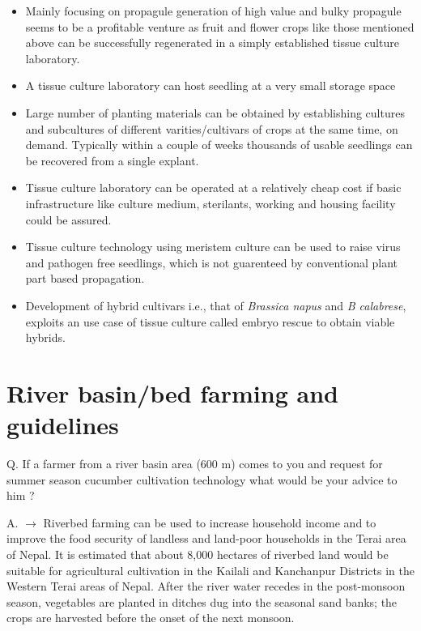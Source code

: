 \documentclass[
  openany]{book}
\providecommand{\tightlist}{%
  \setlength{\itemsep}{0pt}\setlength{\parskip}{0pt}}
\begin{document}
\begin{itemize}
\tightlist
\item
  Mainly focusing on propagule generation of high value and bulky propagule seems to be a profitable venture as fruit and flower crops like those mentioned above can be successfully regenerated in a simply established tissue culture laboratory.
\item
  A tissue culture laboratory can host seedling at a very small storage space
\item
  Large number of planting materials can be obtained by establishing cultures and subcultures of different varities/cultivars of crops at the same time, on demand. Typically within a couple of weeks thousands of usable seedlings can be recovered from a single explant.
\item
  Tissue culture laboratory can be operated at a relatively cheap cost if basic infrastructure like culture medium, sterilants, working and housing facility could be assured.
\item
  Tissue culture technology using meristem culture can be used to raise virus and pathogen free seedlings, which is not guarenteed by conventional plant part based propagation.
\item
  Development of hybrid cultivars i.e., that of \emph{Brassica napus} and \emph{B calabrese}, exploits an use case of tissue culture called embryo rescue to obtain viable hybrids.
\end{itemize}

\hypertarget{river-basinbed-farming-and-guidelines}{%
\section{River basin/bed farming and guidelines}\label{river-basinbed-farming-and-guidelines}}

Q. If a farmer from a river basin area (600 m) comes to you and request for summer season cucumber cultivation technology what would be your advice to him ?

A. \(\longrightarrow\) Riverbed farming can be used to increase household income and to improve the food security of landless and land-poor households in the Terai area of Nepal. It is estimated that about 8,000 hectares of riverbed land would be suitable for agricultural cultivation in the Kailali and Kanchanpur Districts in the Western Terai areas of Nepal. After the river water recedes in the post-monsoon season, vegetables are planted in ditches dug into the seasonal sand banks; the crops are harvested before the onset of the next monsoon.
\end{document}
